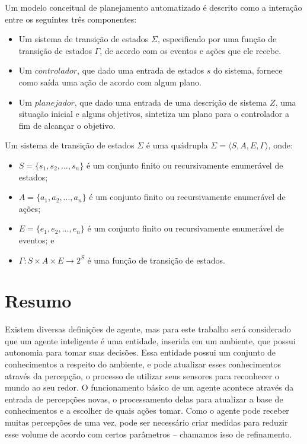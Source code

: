 \begin{definition}{}
\label{definition::autoplanning}
   Um modelo conceitual de planejamento automatizado é descrito como a interação entre os seguintes três componentes:
   
    \begin{itemize}
        \item Um sistema de transição de estados $\Sigma$, especificado por uma função de transição de estados $\Gamma$, de acordo com os eventos e ações que ele recebe. 
        \item Um $controlador$, que dado uma entrada de estados $s$ do sistema, fornece como saída uma ação de acordo com algum plano.
        \item Um $planejador$, que dado uma entrada de uma descrição de sistema $Z$, uma situação inicial e alguns objetivos, sintetiza um plano para o controlador a fim de alcançar o objetivo.
    \end{itemize}
    
    Um sistema de transição de estados $\Sigma$ é uma quádrupla $\Sigma = \langle S, A, E, \Gamma \rangle$, onde:
    
    \begin{itemize}
        \item $S = \{s_1, s_2, ..., s_{n}\}$ é um conjunto finito ou recursivamente enumerável de estados;
        \item $A = \{a_1, a_2, ..., a_{n}\}$ é um conjunto finito ou recursivamente enumerável de ações;
        \item $E = \{e_1, e_2, ..., e_{n}\}$ é um conjunto finito ou recursivamente enumerável de eventos; e 
        \item $\Gamma: S \times A \times E \rightarrow 2^S$ é uma função de transição de estados. 
    \end{itemize}
     
\end{definition}

\section{Resumo}

Existem diversas definições de agente, mas para este trabalho será considerado que um agente inteligente é uma entidade, inserida em um ambiente, que possui autonomia para tomar suas decisões. Essa entidade possui um conjunto de conhecimentos a respeito do ambiente, e pode atualizar esses conhecimentos através da percepção, o processo de utilizar seus sensores para reconhecer o mundo ao seu redor. O funcionamento básico de um agente acontece através da entrada de percepções novas, o processamento delas para atualizar a base de conhecimentos e a escolher de quais ações tomar. Como o agente pode receber muitas percepções de uma vez, pode ser necessário criar medidas para reduzir esse volume de acordo com certos parâmetros -- chamamos isso de refinamento.

